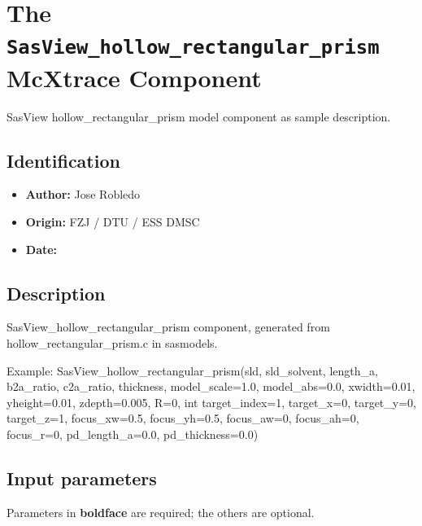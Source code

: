 \section{The \texttt{SasView\_hollow\_rectangular\_prism} McXtrace Component}
SasView hollow\_rectangular\_prism model component as sample description.

\subsection*{Identification}
\begin{itemize}
  \item \textbf{Author:} Jose Robledo
  \item \textbf{Origin:} FZJ / DTU / ESS DMSC
  \item \textbf{Date:} 
\end{itemize}

\subsection*{Description}
SasView\_hollow\_rectangular\_prism component, generated from hollow\_rectangular\_prism.c in sasmodels.

Example: SasView\_hollow\_rectangular\_prism(sld, sld\_solvent, length\_a, b2a\_ratio, c2a\_ratio, thickness, model\_scale=1.0, model\_abs=0.0, xwidth=0.01, yheight=0.01, zdepth=0.005, R=0, int target\_index=1, target\_x=0, target\_y=0, target\_z=1, focus\_xw=0.5, focus\_yh=0.5, focus\_aw=0, focus\_ah=0, focus\_r=0, pd\_length\_a=0.0, pd\_thickness=0.0)

\subsection*{Input parameters}
Parameters in \textbf{boldface} are required; the others are optional.

